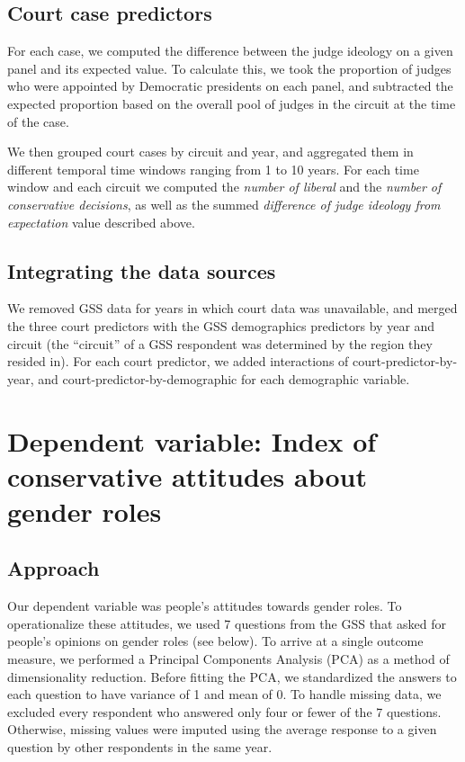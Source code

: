 \documentclass{article}
\begin{document}
\subsection{Court case predictors}\label{court-case-predictors}

For each case, we computed the difference between the judge ideology on
a given panel and its expected value. To calculate this, we took the
proportion of judges who were appointed by Democratic presidents on each
panel, and subtracted the expected proportion based on the overall pool
of judges in the circuit at the time of the case.

We then grouped court cases by circuit and year, and aggregated them in
different temporal time windows ranging from 1 to 10 years. For each
time window and each circuit we computed the \emph{number of liberal}
and the \emph{number of conservative decisions}, as well as the summed
\emph{difference of judge ideology from expectation} value described
above.

\subsection{Integrating the data
sources}\label{integrating-the-data-sources}

We removed GSS data for years in which court data was unavailable, and
merged the three court predictors with the GSS demographics predictors
by year and circuit (the ``circuit'' of a GSS respondent was determined
by the region they resided in). For each court predictor, we added
interactions of court-predictor-by-year, and
court-predictor-by-demographic for each demographic variable.


\section{Dependent variable: Index of conservative attitudes about
gender
roles}\label{dependent-variable-index-of-conservative-attitudes-about-gender-roles}

\subsection{Approach}\label{approach}

Our dependent variable was people's attitudes towards gender roles. To
operationalize these attitudes, we used 7 questions from the GSS that
asked for people's opinions on gender roles (see below). To arrive at a
single outcome measure, we performed a Principal Components Analysis
(PCA) as a method of dimensionality reduction. Before fitting the PCA,
we standardized the answers to each question to have variance of 1 and
mean of 0. To handle missing data, we excluded every respondent who
answered only four or fewer of the 7 questions. Otherwise, missing
values were imputed using the average response to a given question by
other respondents in the same year.
\end{document}
